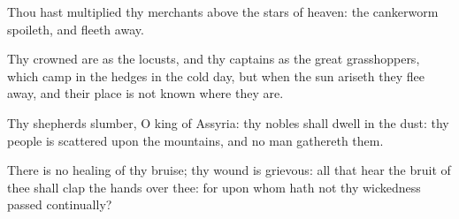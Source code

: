 \Verse Thou hast multiplied thy merchants above the stars of heaven: the cankerworm spoileth, and fleeth away.

\Verse Thy crowned are as the locusts, and thy captains as the great grasshoppers, which camp in the hedges in the cold day, but when the sun ariseth they flee away, and their place is not known where they are.

\Verse Thy shepherds slumber, O king of Assyria: thy nobles shall dwell in the dust: thy people is scattered upon the mountains, and no man gathereth them.

\Verse There is no healing of thy bruise; thy wound is grievous: all that hear the bruit of thee shall clap the hands over thee: for upon whom hath not thy wickedness passed continually?

